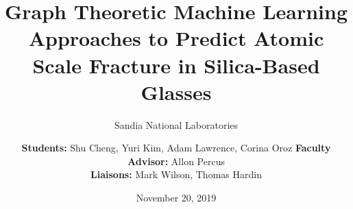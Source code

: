 \documentclass{beamer}
\title[Predicting Atomic Scale Fracture in Silica-Based Glasses]{Graph Theoretic Machine Learning Approaches to Predict Atomic Scale Fracture in Silica-Based Glasses}
\subtitle[SNL]{Sandia National Laboratories}
\author[S. Cheng, Y. Kim, A. Lawrence, C. Oroz]{\textbf{Students:} Shu Cheng, Yuri Kim, Adam Lawrence, Corina Oroz \textbf{Faculty Advisor:} Allon Percus \\ \textbf{Liaisons:} Mark Wilson, Thomas Hardin}
\institute[CGU]{Claremont Graduate University}
\date{November 20, 2019}
\begin{document}
\frame{\titlepage}




%
\end{document}
